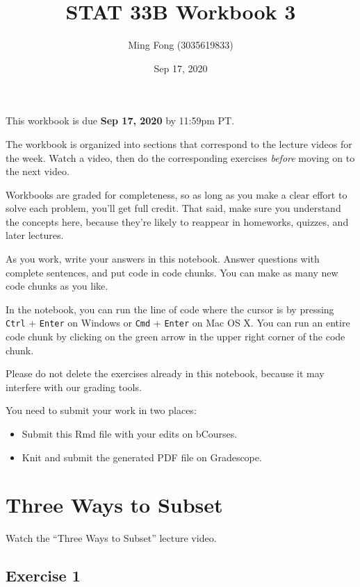 \documentclass[
]{article}
\title{STAT 33B Workbook 3}
\author{Ming Fong (3035619833)}
\date{Sep 17, 2020}
\providecommand{\tightlist}{%
  \setlength{\itemsep}{0pt}\setlength{\parskip}{0pt}}
\begin{document}
\maketitle

This workbook is due \textbf{Sep 17, 2020} by 11:59pm PT.

The workbook is organized into sections that correspond to the lecture
videos for the week. Watch a video, then do the corresponding exercises
\emph{before} moving on to the next video.

Workbooks are graded for completeness, so as long as you make a clear
effort to solve each problem, you'll get full credit. That said, make
sure you understand the concepts here, because they're likely to
reappear in homeworks, quizzes, and later lectures.

As you work, write your answers in this notebook. Answer questions with
complete sentences, and put code in code chunks. You can make as many
new code chunks as you like.

In the notebook, you can run the line of code where the cursor is by
pressing \texttt{Ctrl} + \texttt{Enter} on Windows or \texttt{Cmd} +
\texttt{Enter} on Mac OS X. You can run an entire code chunk by clicking
on the green arrow in the upper right corner of the code chunk.

Please do not delete the exercises already in this notebook, because it
may interfere with our grading tools.

You need to submit your work in two places:

\begin{itemize}
\tightlist
\item
  Submit this Rmd file with your edits on bCourses.
\item
  Knit and submit the generated PDF file on Gradescope.
\end{itemize}

\hypertarget{three-ways-to-subset}{%
\section{Three Ways to Subset}\label{three-ways-to-subset}}

Watch the ``Three Ways to Subset'' lecture video.

\hypertarget{exercise-1}{%
\subsection{Exercise 1}\label{exercise-1}}
\end{document}
